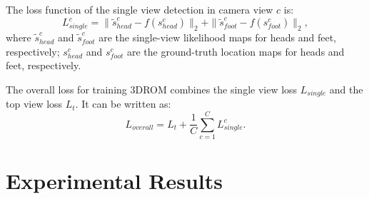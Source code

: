 \documentclass[runningheads]{llncs}
\begin{document}
	The loss function of the single view detection in camera view $c$ is:
	\begin{equation}
		L_{single}^c = \| \tilde{s}_{head}^c - f(s_{head}^c) \|_2 + \| \tilde{s}_{foot}^c - f(s_{foot}^c) \|_2,
	\end{equation}
	where $\tilde{s}_{head}^c$ and $\tilde{s}_{foot}^c$ are the single-view likelihood maps for heads and feet, respectively; $s_{head}^c$ and $s_{foot}^c$ are the ground-truth location maps for heads and feet, respectively.
	
	The overall loss for training 3DROM combines the single view loss $L_{single}$ and the top view loss $L_t$. It can be written as:
	\begin{equation}
		L_{overall} = L_t + \frac{1}{C}\sum^{C}_{c=1}{L_{single}^c}.
	\end{equation}
	
	
	
	\section{Experimental Results}
\end{document}
